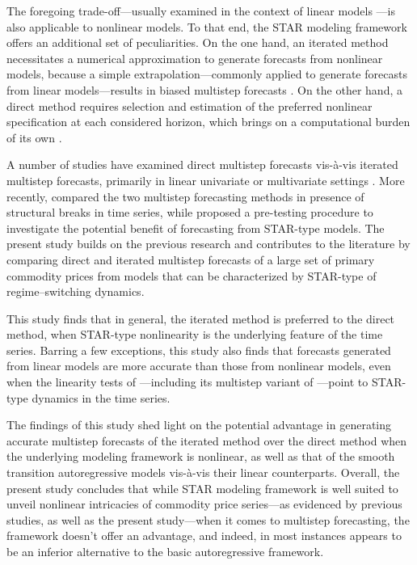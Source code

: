 \documentclass[11pt]{article}
\begin{document}
The foregoing trade-off---usually examined in the context of linear models \citep[e.g.,][]{chevillon2005,marcellino2006}---is also applicable to nonlinear models. To that end, the STAR modeling framework offers an additional set of peculiarities. On the one hand, an iterated method necessitates a numerical approximation to generate forecasts from nonlinear models, because a simple extrapolation---commonly applied to generate forecasts from linear models---results in biased multistep forecasts \citep[e.g.,][]{terasvirta2010}. On the other hand, a direct method requires selection and estimation of the preferred nonlinear specification at each considered horizon, which brings on a computational burden of its own \citep[e.g.,][]{terasvirta2006}. 


A number of studies have examined direct multistep forecasts vis-\`{a}-vis iterated multistep forecasts, primarily in linear univariate or multivariate settings \citep[see, for example,][for the survey of the literature]{chevillon2007}. More recently, \cite{chevillon2016} compared the two multistep forecasting methods in presence of structural breaks in time series, while \cite{enders2015} proposed a pre-testing procedure to investigate the potential benefit of forecasting from STAR-type models. The present study builds on the previous research and contributes to the literature by comparing direct and iterated multistep forecasts of a large set of primary commodity prices from models that can be characterized by STAR-type of regime--switching dynamics. 

This study finds that in general, the iterated method is preferred to the direct method, when STAR-type nonlinearity is the underlying feature of the time series. Barring a few exceptions, this study also finds that forecasts generated from linear models are more accurate than those from nonlinear models, even when the linearity tests of \cite{terasvirta1994}---including its multistep variant of \cite{enders2015}---point to STAR-type dynamics in the time series.

The findings of this study shed light on the potential advantage in generating accurate multistep forecasts of the iterated method over the direct method when the underlying modeling framework is nonlinear, as well as that of the smooth transition autoregressive models vis-\`{a}-vis their linear counterparts. Overall, the present study concludes that while STAR modeling framework is well suited to unveil nonlinear intricacies of commodity price series---as evidenced by previous studies, as well as the present study---when it comes to multistep forecasting, the framework doesn't offer an advantage, and indeed, in most instances appears to be an inferior alternative to the basic autoregressive framework. 
\end{document}
